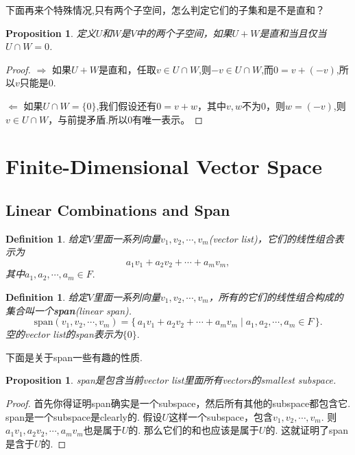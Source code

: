\documentclass{article}
\newtheorem{proposition}[theorem]{Proposition}
\newtheorem{definition}[theorem]{Definition}
\newcommand\Set[2]{\{\,#1\mid#2\,\}} %
\begin{document}
{\color{red} 下面再来个特殊情况,只有两个子空间，怎么判定它们的子集和是不是直和}？

\begin{proposition}
定义$U$和$W$是$V$中的两个子空间，如果$U+W$是直和当且仅当$U \cap W = {0}$.
\end{proposition}

\begin{proof}
$\Rightarrow$ 如果$U+W$是直和，任取$v \in U \cap W$,则$-v \in U \cap W$,而$0 = v + (-v)$,所以$v$只能是$0$.

$\Leftarrow$ 如果$U \cap W = \{0\}$,我们假设还有$0 = v+w$，其中$v,w$不为0，则$w=(-v)$,则$v \in U \cap W$，与前提矛盾.所以$0$有唯一表示。
\end{proof}

\newpage
\section{Finite-Dimensional Vector Space}

\subsection{Linear Combinations and Span}

\begin{definition}
\rm 给定$V$里面一系列向量$v_1,v_2,\cdots,v_m$(vector list)，它们的线性组合表示为
$$
a_1v_1 + a_2v_2 + \cdots + a_mv_m,
$$
其中$a_1,a_2,\cdots,a_m \in F.$
\end{definition}

\begin{definition}
\rm 给定$V$里面一系列向量$v_1,v_2,\cdots,v_m$，所有的它们的线性组合构成的集合叫一个\textbf{span}(linear span). 
$$
\text{span}(v_1,v_2,\cdots,v_m) = \Set{a_1v_1 + a_2v_2 + \cdots + a_mv_m}{a_1,a_2,\cdots,a_m \in F}.
$$
空的vector list的span表示为$\{0\}.$
\end{definition}

{\color{red}下面是关于span一些有趣的性质}.

\begin{proposition}
\rm span是包含当前vector list里面所有vectors的smallest subspace.
\end{proposition}

\begin{proof}
首先你得证明span确实是一个subspace，然后所有其他的subspace都包含它. span是一个subspace是clearly的. 假设$U$这样一个subspace，包含$v_1,v_2,\cdots,v_m$. 则$a_1v_1,a_2v_2,\cdots,a_mv_m$也是属于$U$的. 那么它们的和也应该是属于$U$的. 这就证明了span是含于$U$的. 
\end{proof}
\end{document}

